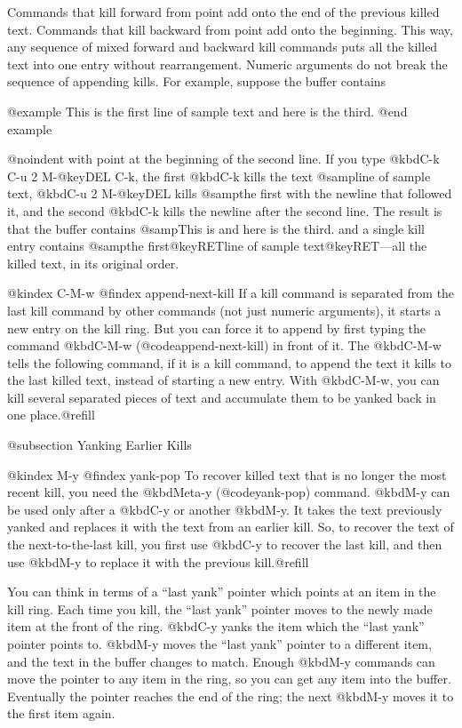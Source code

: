 {{{{{{{  Commands that kill forward from point add onto the end of the previous
killed text.  Commands that kill backward from point add onto the
beginning.  This way, any sequence of mixed forward and backward kill
commands puts all the killed text into one entry without rearrangement.
Numeric arguments do not break the sequence of appending kills.  For
example, suppose the buffer contains

@example
This is the first
line of sample text
and here is the third.
@end example

@noindent
with point at the beginning of the second line.  If you type @kbd{C-k C-u 2
M-@key{DEL} C-k}, the first @kbd{C-k} kills the text @samp{line of sample
text}, @kbd{C-u 2 M-@key{DEL}} kills @samp{the first} with the newline that
followed it, and the second @kbd{C-k} kills the newline after the second
line.  The result is that the buffer contains @samp{This is and here is the
third.} and a single kill entry contains @samp{the first@key{RET}line of
sample text@key{RET}}---all the killed text, in its original order.

@kindex C-M-w
@findex append-next-kill
  If a kill command is separated from the last kill command by other
commands (not just numeric arguments), it starts a new entry on the kill
ring.  But you can force it to append by first typing the command
@kbd{C-M-w} (@code{append-next-kill}) in front of it.  The @kbd{C-M-w}
tells the following command, if it is a kill command, to append the text it
kills to the last killed text, instead of starting a new entry.  With
@kbd{C-M-w}, you can kill several separated pieces of text and accumulate
them to be yanked back in one place.@refill

@subsection Yanking Earlier Kills

@kindex M-y
@findex yank-pop
  To recover killed text that is no longer the most recent kill, you need
the @kbd{Meta-y} (@code{yank-pop}) command.  @kbd{M-y} can be used only
after a @kbd{C-y} or another @kbd{M-y}.  It takes the text previously
yanked and replaces it with the text from an earlier kill.  So, to recover
the text of the next-to-the-last kill, you first use @kbd{C-y} to recover
the last kill, and then use @kbd{M-y} to replace it with the previous
kill.@refill

  You can think in terms of a ``last yank'' pointer which points at an item
in the kill ring.  Each time you kill, the ``last yank'' pointer moves to
the newly made item at the front of the ring.  @kbd{C-y} yanks the item
which the ``last yank'' pointer points to.  @kbd{M-y} moves the ``last
yank'' pointer to a different item, and the text in the buffer changes to
match.  Enough @kbd{M-y} commands can move the pointer to any item in the
ring, so you can get any item into the buffer.  Eventually the pointer
reaches the end of the ring; the next @kbd{M-y} moves it to the first item
again.

}}}}}}}
